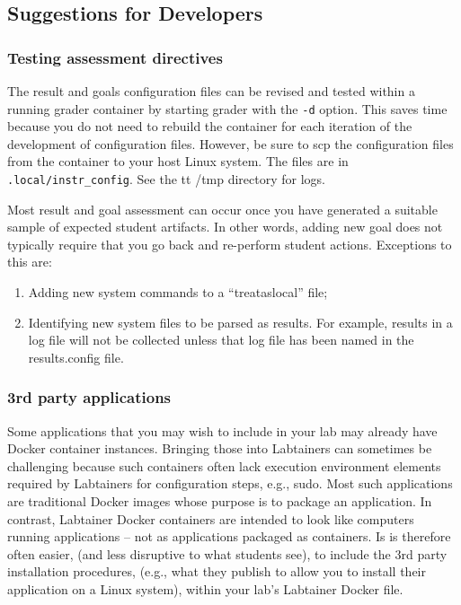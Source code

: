 \documentclass[12pt]{article}
\begin{document}
\subsection{Suggestions for Developers}
\label{suggestions}
\subsubsection{Testing assessment directives}
The result and goals configuration files can be revised and tested within a
running grader container by starting grader with the {\tt -d} option.  This saves time because you do not need to rebuild
the container for each iteration of the development of configuration files.  However,
be sure to scp the configuration files from the container to your host Linux system.  The files are in
{\tt .local/instr\_config}.  See the {tt /tmp} directory for logs.

Most result and goal assessment can occur once you have generated a suitable sample of
expected student artifacts.  In other words, adding new goal does not typically require
that you go back and re-perform student actions.  Exceptions to this are:

\begin{enumerate}
\item Adding new system commands to a ``treataslocal'' file;
\item Identifying new system files to be parsed as results.  For example, results in a log
file will not be collected unless that log file has been named in the results.config file.
\end{enumerate}

\subsubsection{3rd party applications}
Some applications that you may wish to include in your lab may already have Docker container
instances.  Bringing those into Labtainers can sometimes be challenging because such containers
often lack execution environment elements required by Labtainers for configuration steps, e.g.,
{sudo}.  Most such applications are traditional Docker images whose purpose is to package an
application.  In contrast, Labtainer Docker containers are intended to look like computers running
applications -- not as applications packaged as containers.  Is is therefore often easier, (and less
disruptive to what students see), to include the 3rd party installation procedures, (e.g., what they publish
to allow you to install their application on a Linux system), within your lab's Labtainer Docker file.
\end{document}
